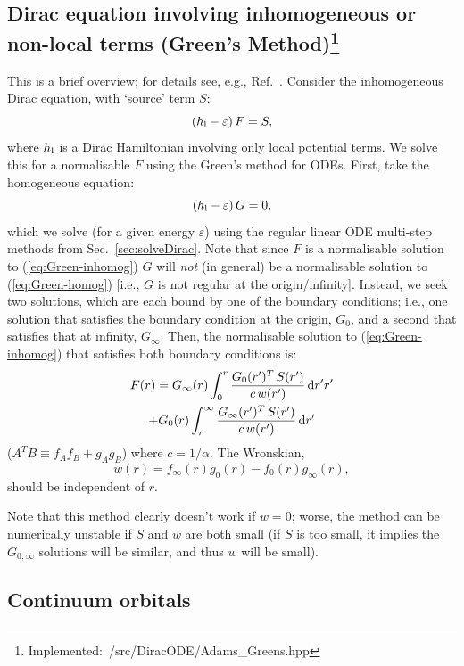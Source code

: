 \documentclass[10pt,twocolumn,a4paper]{article}%
\newcommand{\be}{\begin{equation}}
\newcommand{\ee}{\end{equation}}
\def\d{\ensuremath{{\rm d}}}
\def\en{\ensuremath{\varepsilon}}
\begin{document}
\subsection[Dirac equation involving inhomogeneous terms]{Dirac equation involving inhomogeneous or non-local terms (Green's Method)\footnote{Implemented:~/src/DiracODE/Adams\_Greens.hpp}}


This is a brief overview; for details see, e.g., Ref.~\cite{Arfken2013}.
Consider the inhomogeneous Dirac equation, with `source' term $S$:
\be\label{eq:Green-inhomog}
\left( h_{\rm l}- \en\right)F = S,
\ee
where $h_{\rm l}$ is a Dirac Hamiltonian involving only local potential terms.
We solve this for a normalisable $F$ using the Green's method for ODEs.
First, take the homogeneous equation:
\be\label{eq:Green-homog}
\left(h_{\rm l}- \en\right) G = 0,
\ee
which we solve (for a given energy $\en$) using the regular linear ODE multi-step methods from Sec.~\ref{sec:solveDirac}.
Note that since $F$ is a normalisable solution to (\ref{eq:Green-inhomog}) $G$ will {\em not} (in general) be a normalisable solution to (\ref{eq:Green-homog}) [i.e., $G$ is not regular at the origin/infinity].
Instead, we seek two solutions, which are each bound by one of the boundary conditions; i.e., one solution that satisfies the boundary condition at the origin, $G_0$, and a second that satisfies that at infinity, $G_\infty$.
Then, the normalisable solution to (\ref{eq:Green-inhomog}) that satisfies both boundary conditions is:
\begin{multline}\label{eq:GreensSolution}
F(r) = G_\infty(r) \int_0^r \frac{G_0(r')^T \, S(r')}{c\,w(r')}\,\d r'r'
\\
+  G_0(r) \int_r^\infty \frac{G_\infty(r')^T \, S(r')}{c\,w(r')}\,\d r'
\end{multline}
($A^T B \equiv f_A f_B + g_A g_B$)
where $c=1/\alpha$.
The Wronskian,
\be\label{eq:Green-Wronskian}
w(r) = f_\infty(r) g_0(r) - f_0(r)g_\infty(r),
\ee
should be independent of $r$.


Note that this method clearly doesn't work if $w=0$; worse, the method can be numerically unstable if $S$ and $w$ are both small (if $S$ is too small, it implies the $G_{0,\infty}$ solutions will be similar, and thus $w$ will be small).



\subsection{Continuum orbitals}
\end{document}
